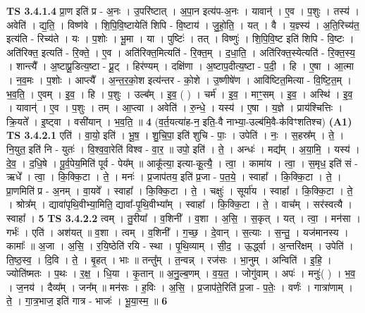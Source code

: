 \documentclass[17pt]{extarticle}
\begin{document}
                  \newline
                                \textbf{ TS 3.4.1.4} \newline
                  प्रा॒ण इति॑ प्र - अ॒नः । उ॒परि॑ष्टात् । अ॒पा॒न इत्य॑प-अ॒नः । यावान्॑ । ए॒व । प॒शुः । तस्य॑ । अवेति॑ । द्य॒ति॒ । विष्ण॑वे । शि॒पि॒वि॒ष्टायेति॑ शिपि - वि॒ष्टाय॑ । जु॒हो॒ति॒ । यत् । वै । य॒ज्ञ्स्य॑ । अ॒ति॒रिच्य॑त॒ इत्य॑ति - रिच्य॑ते । यः । प॒शोः । भू॒मा । या । पुष्टिः॑ । तत् । विष्णुः॑ । शि॒पि॒वि॒ष्ट इति॑ शिपि - वि॒ष्टः । अति॑रिक्त॒ इत्यति॑ - रि॒क्ते॒ । ए॒व । अति॑रिक्त॒मित्यति॑ - रि॒क्त॒म् । द॒धा॒ति॒ । अति॑रिक्त॒स्येत्यति॑ - रि॒क्त॒स्य॒ । शान्त्यै᳚ । अ॒ष्टाप्रू॒डित्य॒ष्टा - प्रू॒ट् । हिर॑ण्यम् । दक्षि॑णा । अ॒ष्टाप॒दीत्य॒ष्टा - प॒दी॒ । हि । ए॒षा । आ॒त्मा । न॒व॒मः । प॒शोः । आप्त्यै᳚ । अ॒न्त॒र॒को॒श इत्य॑न्तर - को॒शे । उ॒ष्णीषे॑ण । आवि॑ष्टित॒मित्या - वि॒ष्टि॒त॒म् । भ॒व॒ति॒ । ए॒वम् । इ॒व॒ । हि । प॒शुः । उल्ब᳚म् । इ॒व॒ ( ) । चर्म॑ । इ॒व॒ । माꣳ॒॒सम् । इ॒व॒ । अस्थि॑ । इ॒व॒ । यावान्॑ । ए॒व । प॒शुः । तम् । आ॒प्त्वा । अवेति॑ । रु॒न्धे॒ । यस्य॑ । ए॒षा । य॒ज्ञे । प्राय॑श्चित्तिः । क्रि॒यते᳚ । इ॒ष्ट्वा । वसी॑यान् । भ॒व॒ति॒ ॥ \textbf{  4} \newline
                  \newline
                      (व॒र्त॒यत्या॑ह-न॒ इति॒-वै नाभ्या॒-उल्ब॑मि॒वै-क॑विꣳशतिश्च)  \textbf{(A1)} \newline \newline
                                \textbf{ TS 3.4.2.1} \newline
                  एति॑ । वा॒यो॒ इति॑ । भू॒ष॒ । शु॒चि॒पा॒ इति॑ शुचि - पाः॒ । उपेति॑ । नः॒ । स॒हस्र᳚म् । ते॒ । नि॒युत॒ इति॑ नि - युतः॑ । वि॒श्व॒वा॒रेति॑ विश्व - वा॒र॒ ॥ उपो॒ इति॑ । ते॒ । अन्धः॑ । मद्य᳚म् । अ॒या॒मि॒ । यस्य॑ । दे॒व॒ । द॒धि॒षे । पू॒र्व॒पेय॒मिति॑ पूर्व - पेय᳚म् ॥ आकू᳚त्या॒ इत्या-कू॒त्यै॒ । त्वा॒ । कामा॑य । त्वा॒ । स॒मृध॒ इति॑ सं - ऋधे᳚ । त्वा॒ । कि॒क्कि॒टा । ते॒ । मनः॑ । प्र॒जाप॑तय॒ इति॑ प्र॒जा - प॒त॒ये॒ । स्वाहा᳚ । कि॒क्कि॒टा । ते॒ । प्रा॒णमिति॑ प्र - अ॒नम् । वा॒यवे᳚ । स्वाहा᳚ । कि॒क्कि॒टा । ते॒ । चक्षुः॑ । सूर्या॑य । स्वाहा᳚ । कि॒क्कि॒टा । ते॒ । श्रोत्र᳚म् । द्यावा॑पृथि॒वीभ्या॒मिति॒ द्यावा᳚-पृ॒थि॒वीभ्या᳚म् । स्वाहा᳚ । कि॒क्कि॒टा । ते॒ । वाच᳚म् । सर॑स्वत्यै । स्वाहा᳚ । \textbf{  5} \newline
                  \newline
                                \textbf{ TS 3.4.2.2} \newline
                  त्वम् । तु॒रीया᳚ । व॒शिनी᳚ । व॒शा । अ॒सि॒ । स॒कृत् । यत् । त्वा॒ । मन॑सा । गर्भः॑ । एति॑ । अश॑यत् ॥ व॒शा । त्वम् । व॒शिनी᳚ । ग॒च्छ॒ । दे॒वान् । स॒त्याः । स॒न्तु॒ । यज॑मानस्य । कामाः᳚ ॥ अ॒जा । अ॒सि॒ । र॒यि॒ष्ठेति॑ रयि - स्था । पृ॒थि॒व्याम् । सी॒द॒ । ऊ॒र्द्ध्वा । अ॒न्तरि॑क्षम् । उपेति॑ । ति॒ष्ठ॒स्व॒ । दि॒वि । ते॒ । बृ॒हत् । भाः ॥ तन्तु᳚म् । त॒न्वन्न् । रज॑सः । भा॒नुम् । अन्विति॑ । इ॒हि॒ । ज्योति॑ष्मतः । प॒थः । र॒क्ष॒ । धि॒या । कृ॒तान् ॥ अ॒नु॒ल्ब॒णम् । व॒य॒त॒ । जोगु॑वाम् । अपः॑ । मनुः॑( ) । भ॒व॒ । ज॒नय॑ । दैव्य᳚म् । जन᳚म् ॥ मन॑सः । ह॒विः । अ॒सि॒ । प्र॒जाप॑ते॒रिति॑ प्र॒जा - प॒तेः॒ । वर्णः॑ । गात्रा॑णाम् । ते॒ । गा॒त्र॒भाज॒ इति॑ गात्र - भाजः॑ । भू॒या॒स्म॒ ॥ \textbf{  6} \newline
\end{document}

